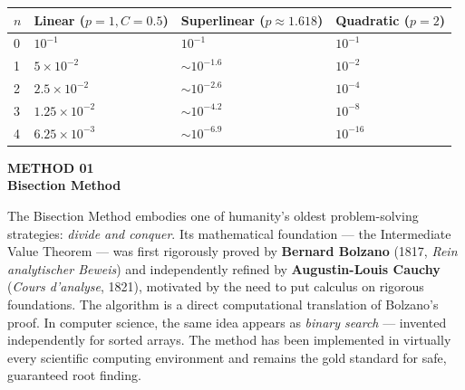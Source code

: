 \documentclass[12pt]{article}
\newcommand{\hcell}[1]{\textbf{\color{white}#1}}
\begin{document}
\begin{center}{\small
\begin{tabular}{C{1cm} C{3.5cm} C{3.5cm} C{3.5cm}}
\toprule
{}
\hcell{$n$} & \hcell{Linear ($p=1,C=0.5$)} & \hcell{Superlinear ($p\approx 1.618$)} & \hcell{Quadratic ($p=2$)} \\
\midrule
{}
0 & $10^{-1}$ & $10^{-1}$ & $10^{-1}$ \\
1 & $5\times10^{-2}$ & $\sim10^{-1.6}$ & $10^{-2}$ \\
2 & $2.5\times10^{-2}$ & $\sim10^{-2.6}$ & $10^{-4}$ \\
3 & $1.25\times10^{-2}$ & $\sim10^{-4.2}$ & $10^{-8}$ \\
4 & $6.25\times10^{-3}$ & $\sim10^{-6.9}$ & $10^{-16}$ \\
\bottomrule
\end{tabular}
}\end{center}

\newpage


\begin{tcolorbox}[
  enhanced, arc=0pt, boxrule=0pt,
  colback=primary, colframe=primary,
  left=16pt, right=16pt, top=14pt, bottom=10pt,
  borderline south={4pt}{0pt}{accent},
]
  {\color{accent!70}\small\bfseries METHOD 01}\\[4pt]
  {\LARGE\bfseries\color{white} Bisection Method}
\end{tcolorbox}

\vspace{10pt}

\begin{histbox}
The Bisection Method embodies one of humanity's oldest problem-solving strategies: \textit{divide and conquer}. Its mathematical foundation — the Intermediate Value Theorem — was first rigorously proved by \textbf{Bernard Bolzano} (1817, \textit{Rein analytischer Beweis}) and independently refined by \textbf{Augustin-Louis Cauchy} (\textit{Cours d'analyse}, 1821), motivated by the need to put calculus on rigorous foundations. The algorithm is a direct computational translation of Bolzano's proof. In computer science, the same idea appears as \textit{binary search} — invented independently for sorted arrays. The method has been implemented in virtually every scientific computing environment and remains the gold standard for safe, guaranteed root finding.
\end{histbox}
\end{document}
